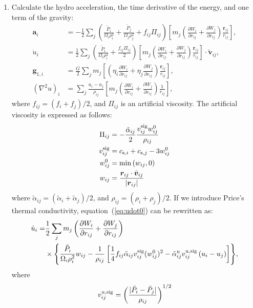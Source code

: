 \documentclass[fleqn,dvipdfmx]{article}
\begin{document}
\begin{enumerate}
\item Calculate the hydro acceleration, the time derivative of the
  energy, and one term of the gravity: \label{item:hydro}
  \begin{align}
    \bm{a}_i &= - \frac{1}{2} \sum_j \left(
    \frac{\tilde{P}_i}{\Omega_i \rho_i^2} +
    \frac{\tilde{P}_j}{\Omega_j \rho_j^2} + f_{ij} \Pi_{ij} \right)
    \left[ m_j \left( \frac{\partial W_i}{\partial r_{ij}} +
      \frac{\partial W_j}{\partial r_{ij}} \right)
      \frac{\bm{r}_{ij}}{r_{ij}} \right], \label{eq:momentum} \\
    \dot{u}_i &= \frac{1}{2} \sum_j \left( \frac{\tilde{P}_i}{\Omega_i
      \rho_i^2} + \frac{f_{ij} \Pi_{ij}}{2} \right)
    \left[ m_j \left( \frac{\partial W_i}{\partial r_{ij}} +
      \frac{\partial W_j}{\partial r_{ij}} \right)
      \frac{\bm{r}_{ij}}{r_{ij}} \right] \cdot
    \tilde{\bm{v}}_{ij}, \label{eq:udot0} \\
    \bm{g}_{1,i} &= \frac{G}{2} \sum_j m_j \left[ \left( \eta_i
      \frac{\partial W_{i}}{\partial r_{ij}} + \eta_j \frac{\partial
        W_{j}}{\partial r_{ij}} \right) \frac{\bm{r}_{ij}}{r_{ij}}
      \right], \\    
    \left( \nabla^2 u \right)_i &= \sum_j \frac{u_i - u_j}{\rho_{ij}}
    \left[ m_j \left( \frac{\partial W_i}{\partial r_{ij}} +
      \frac{\partial W_j}{\partial r_{ij}} \right)
      \frac{1}{r_{ij}} \right],
  \end{align}
  where $f_{ij}=(f_i+f_j)/2$, and $\Pi_{ij}$ is an artificial
  viscosity. The artificial viscosity is expressed as follows:
  \begin{align}
    \Pi_{ij} &= - \frac{\tilde{\alpha}_{ij}}{2} \frac{v_{ij}^{\rm sig}
      w_{ij}^0}{\rho_{ij}} \\
    v_{ij}^{\rm sig} &= c_{{\rm s},i} + c_{{\rm s},j} - 3w_{ij}^0 \\
    w_{ij}^0 &= \min \left(w_{ij},0\right) \\
    w_{ij} &= \frac{\bm{r}_{ij} \cdot
      \tilde{\bm{v}}_{ij}}{|\bm{r}_{ij}|}
  \end{align}
  where $\tilde{\alpha}_{ij}=(\tilde{\alpha}_i+\tilde{\alpha}_j)/2$,
  and $\rho_{ij}=(\rho_i+\rho_j)/2$. If we introduce Price's thermal
  conductivity, equation~(\ref{eq:udot0}) can be rewritten as:
  \begin{align}
    \dot{u}_i = &\frac{1}{2} \sum_j m_j \left( \frac{\partial
      W_i}{\partial r_{ij}} + \frac{\partial W_j}{\partial r_{ij}}
    \right) \nonumber \\ 
    &\times \Biggl\{ \frac{\tilde{P}_i}{\Omega_i \rho_i^2} w_{ij} -
    \frac{1}{\rho_{ij}} \left[ \frac{1}{4} f_{ij} \tilde{\alpha}_{ij}
      v_{ij}^{\rm sig} (w_{ij}^0)^2 - \tilde{\alpha}_{ij}^{\rm u}
      v_{ij}^{\rm u,sig} \left( u_i - u_j \right) \right]
    \Biggr\}, \label{eq:udot1}
  \end{align}
  where
  \begin{align}
    v_{ij}^{\rm u,sig} = \left( \frac{| \tilde{P}_i - \tilde{P}_j
      |}{\rho_{ij}} \right)^{1/2}
  \end{align}


\end{enumerate}
\end{document}
